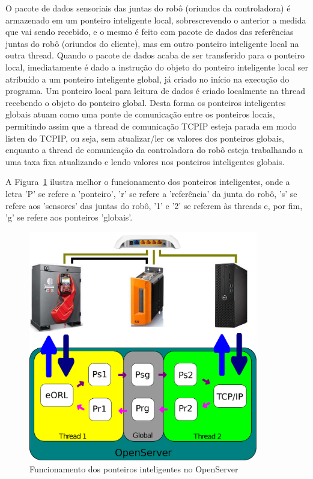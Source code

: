             O pacote de dados sensoriais das juntas do robô (oriundos da controladora) é armazenado em um ponteiro inteligente local, sobrescrevendo o anterior a medida que vai sendo recebido, e o mesmo é feito com pacote de dados das referências juntas do robô (oriundos do cliente), mas em outro ponteiro inteligente local na outra thread. Quando o pacote de dados acaba de ser transferido para o ponteiro local, imediatamente é dado a instrução do objeto do ponteiro inteligente local ser atribuído a um ponteiro inteligente global, já criado no início na execução do programa. Um ponteiro local para leitura de dados é criado localmente na thread recebendo o objeto do ponteiro global. Desta forma os ponteiros inteligentes globais atuam como uma ponte de comunicação entre os ponteiros locais, permitindo assim que a thread de comunicação \ac{TCPIP} esteja parada em modo listen do \ac{TCPIP}, ou seja, sem atualizar/ler os valores dos ponteiros globais, enquanto a thread de comunicação da controladora do robô esteja trabalhando a uma taxa fixa atualizando e lendo valores nos ponteiros inteligentes globais.
            
            A Figura~\ref{fig:ponteiros} ilustra melhor o funcionamento dos ponteiros inteligentes, onde a letra 'P' se refere a 'ponteiro', 'r' se refere a 'referência' da junta do robô, 's' se refere aos 'sensores' das juntas do robô, '1' e '2' se referem às threads e, por fim, 'g' se refere aos ponteiros 'globais'.
            
            \begin{figure}[H]
                \centering
                \includegraphics[width=10cm]{imagens/Softwares/ponteiro.eps}
                \small 
                \centering 
                \caption{Funcionamento dos ponteiros inteligentes no OpenServer}
                \label{fig:ponteiros}
            \end{figure}
        
